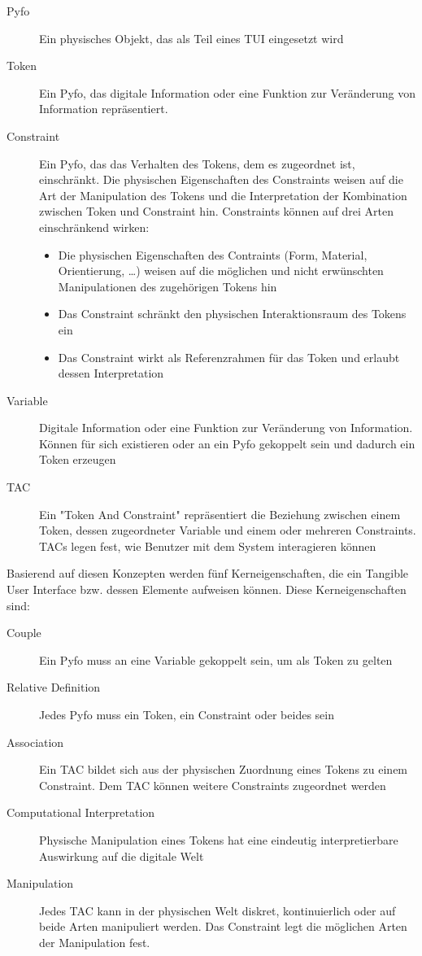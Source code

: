 \begin{description}
 \item[Pyfo] Ein physisches Objekt, das als Teil eines \gls{TUI} eingesetzt wird
 \item[Token] Ein Pyfo, das digitale Information oder eine Funktion zur Veränderung von Information repräsentiert.
 \item[Constraint] Ein Pyfo, das das Verhalten des Tokens, dem es zugeordnet ist, einschränkt. Die physischen Eigenschaften des Constraints weisen auf die Art der Manipulation des Tokens und die Interpretation der Kombination zwischen Token und Constraint hin. Constraints können auf drei Arten einschränkend wirken:
  \begin{itemize}
   \item Die physischen Eigenschaften des Contraints (Form, Material, Orientierung, \ldots) weisen auf die möglichen und nicht erwünschten Manipulationen des zugehörigen Tokens hin
   \item Das Constraint schränkt den physischen Interaktionsraum des Tokens ein
   \item Das Constraint wirkt als Referenzrahmen für das Token und erlaubt dessen Interpretation
  \end{itemize}
 \item[Variable] Digitale Information oder eine Funktion zur Veränderung von Information. Können für sich existieren oder an ein Pyfo gekoppelt sein und dadurch ein Token erzeugen
 \item[TAC] Ein "Token And Constraint" repräsentiert die Beziehung zwischen einem Token, dessen zugeordneter Variable und einem oder mehreren Constraints. \glspl{TAC} legen fest, wie Benutzer mit dem System interagieren können
\end{description}

Basierend auf diesen Konzepten werden fünf Kerneigenschaften, die ein Tangible User Interface bzw. dessen Elemente aufweisen können. Diese Kerneigenschaften sind:

\begin{description}
	\item[Couple] Ein Pyfo muss an eine Variable gekoppelt sein, um als Token zu gelten
	\item[Relative Definition] Jedes Pyfo muss ein Token, ein Constraint oder beides sein
	\item[Association] Ein \gls{TAC} bildet sich aus der physischen Zuordnung eines Tokens zu einem Constraint. Dem \gls{TAC} können weitere Constraints zugeordnet werden
	\item[Computational Interpretation] Physische Manipulation eines Tokens hat eine eindeutig interpretierbare Auswirkung auf die digitale Welt
	\item[Manipulation] Jedes \gls{TAC} kann in der physischen Welt diskret, kontinuierlich oder auf beide Arten manipuliert werden. Das Constraint legt die möglichen Arten der Manipulation fest.  
\end{description}

